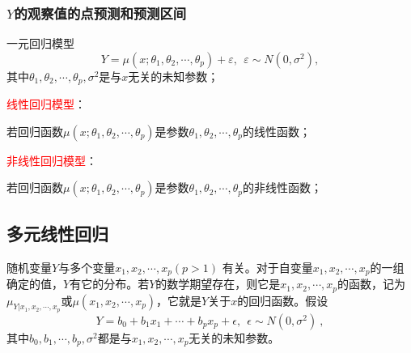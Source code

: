 \documentclass[12pt,a4paper]{article}
\begin{document}
\subsubsection{$Y$的观察值的点预测和预测区间}

一元回归模型
\begin{equation}
Y = \mu(x; \theta_1, \theta_2, \cdots, \theta_p) +\varepsilon, ~~ \varepsilon \sim N(0, \sigma^2), 
\end{equation}
其中$\theta_1, \theta_2, \cdots, \theta_p, \sigma^2$是与$x$无关的未知参数；

\textcolor{red}{线性回归模型}：

若回归函数$\mu(x; \theta_1, \theta_2, \cdots, \theta_p)$是参数$\theta_1, \theta_2, \cdots, \theta_p$的线性函数；

\textcolor{red}{非线性回归模型}：

若回归函数$\mu(x; \theta_1, \theta_2, \cdots, \theta_p)$是参数$\theta_1, \theta_2, \cdots, \theta_p$的非线性函数；

\subsection{多元线性回归}
随机变量$Y$与多个变量$x_1, x_2, \cdots, x_p (p > 1)$ 有关。对于自变量$x_1, x_2, \cdots, x_p$的一组确定的值，$Y$有它的分布。若$Y$的数学期望存在，则它是$x_1, x_2, \cdots, x_p$的函数，记为$\mu_{Y|x_1, x_2, \cdots, x_p}$或$\mu(x_1, x_2, \cdots, x_p)$，它就是$Y$关于$x$的回归函数。假设
\begin{equation}
Y = b_0 +b_1 x_1 + \cdots + b_p x_p + \epsilon, ~~\epsilon \sim N(0, \sigma^2) ~,
\end{equation}
其中$b_0, b_1, \cdots, b_p, \sigma^2$都是与$x_1, x_2, \cdots, x_p$无关的未知参数。
\end{document}
